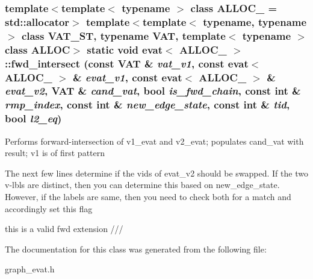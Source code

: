 \subsubsection{\setlength{\rightskip}{0pt plus 5cm}template$<$template$<$ typename $>$ class ALLOC\_\- = std::allocator$>$ template$<$template$<$ typename, typename $>$ class VAT\_\-ST, typename VAT, template$<$ typename $>$ class ALLOC$>$ static void \bf{evat}$<$ ALLOC\_\- $>$::fwd\_\-intersect (const VAT \& {\em vat\_\-v1}, const \bf{evat}$<$ ALLOC\_\- $>$ \& {\em evat\_\-v1}, const \bf{evat}$<$ ALLOC\_\- $>$ \& {\em evat\_\-v2}, VAT \& {\em cand\_\-vat}, bool {\em is\_\-fwd\_\-chain}, const int \& {\em rmp\_\-index}, const int \& {\em new\_\-edge\_\-state}, const int \& {\em tid}, bool {\em l2\_\-eq})\hspace{0.3cm}{\tt  [inline, static]}}\label{classevat_bc5576e52b82773178fbb086d4513a6b}


Performs forward-intersection of v1\_\-evat and v2\_\-evat; populates cand\_\-vat with result; v1 is of first pattern 

The next few lines determine if the vids of evat\_\-v2 should be swapped. If the two v-lbls are distinct, then you can determine this based on new\_\-edge\_\-state. However, if the labels are same, then you need to check both for a match and accordingly set this flag

this is a valid fwd extension /// 

The documentation for this class was generated from the following file:\begin{CompactItemize}
\item 
graph\_\-evat.h\end{CompactItemize}
